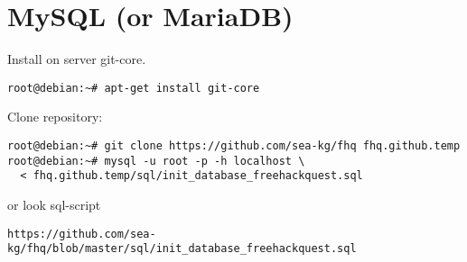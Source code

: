 \section{MySQL (or MariaDB)}
\par
Install on server git-core. \\
\begin{Verbatim}[frame=single]
root@debian:~# apt-get install git-core
\end{Verbatim}

Clone repository:
\begin{Verbatim}[frame=single]
root@debian:~# git clone https://github.com/sea-kg/fhq fhq.github.temp
root@debian:~# mysql -u root -p -h localhost \
  < fhq.github.temp/sql/init_database_freehackquest.sql
\end{Verbatim}

or look sql-script
\begin{Verbatim}[frame=single]
https://github.com/sea-kg/fhq/blob/master/sql/init_database_freehackquest.sql
\end{Verbatim}